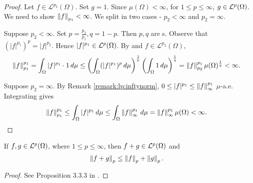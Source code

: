 \begin{proof}
Let $f \in \mathcal{L}^{p_2}(\Omega)$. Set $g = 1$. Since $\mu(\Omega) < \infty$, for $1 \leq p \leq \infty$, $g \in {\mathcal {L}^p}(\Omega)$. We need to show $\left\lVert f\right\rVert_{p_1} < \infty$. We split in two cases - $p_2 < \infty$ and $p_2 = \infty$.

Suppose $p_2 < \infty$. Set $p = \frac{p_2}{p_1}, q = 1 - p$. Then $p, q$ are s. Observe that $(|f|^{p_1})^p = |f|^{p_2}$. Hence $|f|^{p_1} \in {\mathcal {L}^p}(\Omega)$. By  and $f \in \mathcal{L}^{p_2}(\Omega)$, 
\begin{align*}
    \left\lVert f\right\rVert_{p_1}^{p_1} = \int_\Omega |f|^{p_1} \cdot 1 \,d\mu \leq \left ( \int_\Omega (|f|^{p_1})^p  \,d\mu \right )^{\frac{1}{p}} \left ( \int_\Omega 1 \,d\mu \right )^{\frac{1}{q}} = \left\lVert f\right\rVert_{p_2}^{p_1} \mu(\Omega)^{\frac{1}{q}} < \infty.
\end{align*}

Suppose $p_2 = \infty$. By Remark \ref{remark:lp:inftynorm}, $0 \leq |f|^{p_1} \leq \left\lVert f\right\rVert_\infty^{p_1}$ $\mu$-a.e. Integrating gives
\begin{align*}
   \left\lVert f\right\rVert_{p_1}^{p_1} \leq \int_\Omega |f|^{p_1} \,d\mu \leq  \int_\Omega \left\lVert f\right\rVert_\infty^{p_1} \,d\mu =  \left\lVert f\right\rVert_\infty^{p_1} \mu(\Omega) < \infty.
\end{align*}
\end{proof}

\begin{theorem}
\label{ineqn:lp:minkowski}
If $f, g \in {\mathcal {L}^p}(\Omega)$, where $1 \leq p \leq \infty$, then $f + g \in {\mathcal {L}^p}(\Omega)$ and
\begin{align*}
    \left\lVert f + g\right\rVert_p \leq \left\lVert f\right\rVert_p + \left\lVert g\right\rVert_p.
\end{align*}
\end{theorem}
\begin{proof}
See Proposition 3.3.3 in \cite{cohn_2013_measure}.
\end{proof}